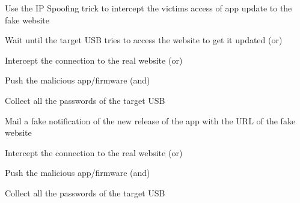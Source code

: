 \begin{myEnumerate}
\begin{myEnumerate}[label*=\arabic*.]
\begin{myEnumerate}[label*=\arabic*.]
\begin{myEnumerate}[label*=\arabic*.]
      \end{myEnumerate}
    \item Use the IP Spoofing trick to intercept the victims access of app
      update to the fake website
      \begin{myEnumerate}[label*=\arabic*.]
      \item Wait until the target USB tries to access the website to get it updated (or)
        \begin{myEnumerate}[label*=\arabic*.]
        \item Intercept the connection to the real website (or)
          \begin{myEnumerate}[label*=\arabic*.]
          \item Push the malicious app/firmware (and)
            \begin{myEnumerate}[label*=\arabic*.]
            \item Collect all the passwords of the target USB
            \end{myEnumerate}
          \end{myEnumerate}
        \end{myEnumerate}
      \item Mail a fake notification of the new release of the app with the URL of
        the fake website
        \begin{myEnumerate}[label*=\arabic*.]
        \item Intercept the connection to the real website (or)
          \begin{myEnumerate}[label*=\arabic*.]
          \item Push the malicious app/firmware (and)
            \begin{myEnumerate}[label*=\arabic*.]
            \item Collect all the passwords of the target USB
            \end{myEnumerate}
          \end{myEnumerate}
        \end{myEnumerate}
      \end{myEnumerate}
    \end{myEnumerate}
  \end{myEnumerate}
\end{myEnumerate}
